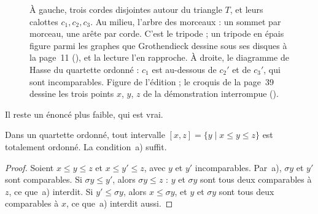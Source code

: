 \begin{figure}[htbp]
\centering
{}
\caption{À gauche, trois cordes disjointes autour du triangle $T$, et leurs calottes $c_1, c_2, c_3$. Au milieu, l'arbre des morceaux : un sommet par morceau, une arête par corde. C'est le tripode ; un tripode en  épais figure parmi les graphes que Grothendieck dessine sous ses disques à la page~11 (), et la lecture l'en rapproche. À droite, le diagramme de Hasse du quartette ordonné : $c_1$ est au-dessous de $c_2'$ et de $c_3'$, qui sont incomparables. Figure de l'édition ; le croquis de la page~39 dessine les trois points $x$, $y$, $z$ de la démonstration interrompue ().}
\label{fig:81-tripode}
\end{figure}

Il reste un énoncé plus faible, qui est vrai.

\begin{enonce}
Dans un quartette ordonné, tout intervalle $[x, z] = \{y \mid x \leqslant y \leqslant z\}$ est totalement ordonné. La condition~a) suffit.
\end{enonce}

\begin{proof}
Soient $x \leqslant y \leqslant z$ et $x \leqslant y' \leqslant z$, avec $y$ et $y'$ incomparables. Par~a), $\sigma y$ et $y'$ sont comparables. Si $\sigma y \leqslant y'$, alors $\sigma y \leqslant z$ : $y$ et $\sigma y$ sont tous deux comparables à $z$, ce que~a) interdit. Si $y' \leqslant \sigma y$, alors $x \leqslant \sigma y$, et $y$ et $\sigma y$ sont tous deux comparables à $x$, ce que~a) interdit aussi.
\end{proof}

